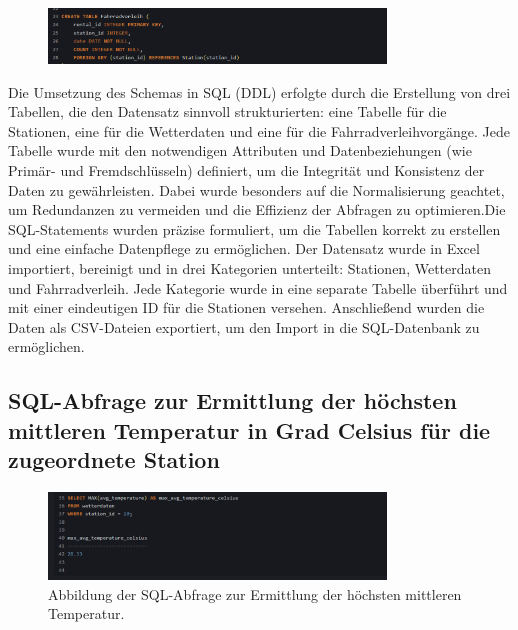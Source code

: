 \documentclass[a4paper,12pt]{article}
\begin{document}
\begin{figure}[h!]
\centering
\includegraphics[width=0.8\textwidth]{20241201_19515000.png}  %
\label{fig:bild3}
\end{figure}

Die Umsetzung des Schemas in SQL (DDL) erfolgte durch die Erstellung von drei Tabellen, die den Datensatz sinnvoll strukturierten: eine Tabelle für die Stationen, eine für die Wetterdaten und eine für die Fahrradverleihvorgänge. Jede Tabelle wurde mit den notwendigen Attributen und Datenbeziehungen (wie Primär- und Fremdschlüsseln) definiert, um die Integrität und Konsistenz der Daten zu gewährleisten. Dabei wurde besonders auf die Normalisierung geachtet, um Redundanzen zu vermeiden und die Effizienz der Abfragen zu optimieren.Die SQL-Statements wurden präzise formuliert, um die Tabellen korrekt zu erstellen und eine einfache Datenpflege zu ermöglichen.
Der Datensatz wurde in Excel importiert, bereinigt und in drei Kategorien unterteilt: Stationen, Wetterdaten und Fahrradverleih. Jede Kategorie wurde in eine separate Tabelle überführt und mit einer eindeutigen ID für die Stationen versehen. Anschließend wurden die Daten als CSV-Dateien exportiert, um den Import in die SQL-Datenbank zu ermöglichen.

\subsection{SQL-Abfrage zur Ermittlung der höchsten mittleren Temperatur in Grad Celsius für die zugeordnete Station}

\begin{figure}[h!]
\centering
\includegraphics[width=0.8\textwidth]{20241201_20055471.png}  %
\caption{Abbildung der SQL-Abfrage zur Ermittlung der höchsten mittleren Temperatur.}
\label{fig:sql_query}
\end{figure}
\end{document}
